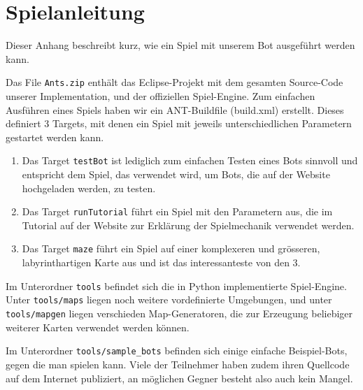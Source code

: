 \chapter{Spielanleitung}
\label{chap:spielanleitung}

Dieser Anhang beschreibt kurz, wie ein Spiel mit unserem Bot ausgef\"uhrt werden kann.

Das File \texttt{Ants.zip} enth\"alt das Eclipse-Projekt mit dem gesamten Source-Code unserer Implementation, und der offiziellen Spiel-Engine. Zum einfachen Ausf\"uhren eines Spiels haben wir ein ANT-Buildfile (build.xml) erstellt. Dieses definiert 3 Targets, mit denen ein Spiel mit jeweils unterschiedlichen Parametern gestartet werden kann.
\begin{enumerate}
\item{Das Target \texttt{testBot} ist lediglich zum einfachen Testen eines Bots sinnvoll und entspricht dem Spiel, das verwendet wird, um Bots, die auf der Website hochgeladen werden, zu testen.}

\item{Das Target \texttt{runTutorial} f\"uhrt ein Spiel mit den Parametern aus, die im Tutorial auf der Website zur Erkl\"arung der Spielmechanik verwendet werden.}
\item{
Das Target \texttt{maze} f\"uhrt ein Spiel auf einer komplexeren und gr\"osseren, labyrinthartigen Karte aus und ist das interessanteste von den 3.}

\end{enumerate}

Im Unterordner \texttt{tools} befindet sich die in Python implementierte Spiel-Engine. Unter \texttt{tools/maps} liegen noch weitere vordefinierte Umgebungen, und unter \texttt{tools/mapgen} liegen verschieden Map-Generatoren, die zur Erzeugung beliebiger weiterer Karten verwendet werden k\"onnen. 

Im Unterordner \texttt{tools/sample\_bots} befinden sich einige einfache Beispiel-Bots, gegen die man spielen kann. Viele der Teilnehmer haben zudem ihren Quellcode auf dem Internet publiziert, an m\"oglichen Gegner besteht also auch kein Mangel.